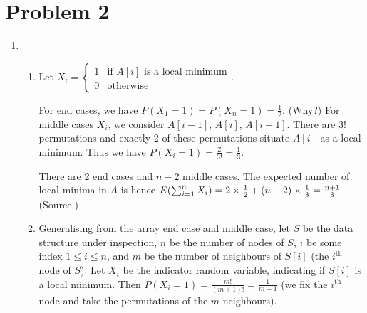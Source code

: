 \documentclass[12pt,a4paper]{article}
\begin{document}
\section*{Problem 2}
	\begin{enumerate}[label=(\alph*)]
		\item 
		\begin{enumerate}[label=(\roman*)]
			\item Let
			$
			X_i =
			\begin{cases}
				1 & \text{if $A[i]$ is a local minimum} \\
				0 & \text{otherwise}
			\end{cases}
			$.
			
			For end cases, we have $P(X_1 = 1) = P(X_n = 1) = \frac{1}{2}$. (Why?\footnotemark[2])
			For middle cases $X_i$, we consider $A[i-1]$, $A[i]$, $A[i+1]$. There are 3! permutations and exactly 2 of these permutations situate $A[i]$ as a local minimum. Thus we have $P(X_i = 1) = \frac{2}{3!} = \frac{1}{3}$.

			There are 2 end cases and $n - 2$ middle cases. The expected number of local minima in $A$ is hence $E\parens*{\sum_{i=1}^n X_i} = 2 \times \frac{1}{2} + (n - 2) \times \frac{1}{3} = \frac{n + 1}{3}$. (Source.\footnotemark[3])


			\addtocounter{footnote}{2}

			\item 
			Generalising from the array end case and middle case, let $S$ be the data structure under inspection, $n$ be the number of nodes of $S$, $i$ be some index $1 \le i \le n$, and $m$ be the number of neighbours of $S[i]$ (the $i^{\text{th}}$ node of $S$). Let $X_i$ be the indicator random variable, indicating if $S[i]$ is a local minimum. Then $P(X_i = 1) = \frac{m!}{(m+1)!} = \frac{1}{m+1}$ (we fix the $i^\text{th}$ node and take the permutations of the $m$ neighbours).


\end{enumerate}
\end{enumerate}
\end{document}
